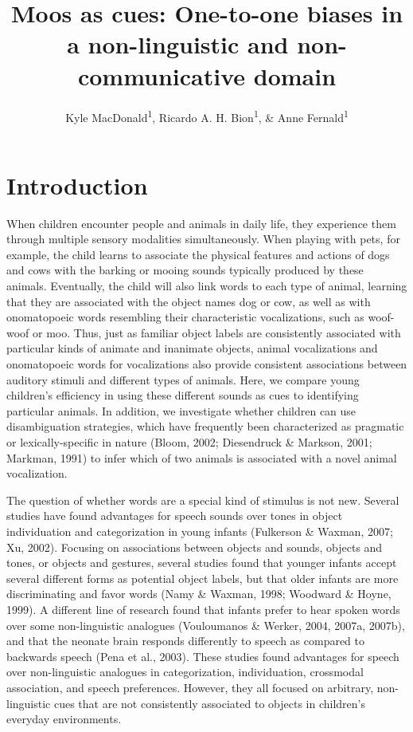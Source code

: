 \documentclass[english,floatsintext,man]{apa6}
\title{Moos as cues: One-to-one biases in a non-linguistic and
non-communicative domain}
\author{Kyle MacDonald\textsuperscript{1}, Ricardo A. H. Bion\textsuperscript{1}, \& Anne Fernald\textsuperscript{1}}
\affiliation{
    \vspace{0.5cm}
          \textsuperscript{1} Stanford University  }
\theoremstyle{definition}
\theoremstyle{definition}
\theoremstyle{definition}
\theoremstyle{remark}
\begin{document}
\maketitle

\setcounter{secnumdepth}{0}



\section{Introduction}\label{introduction}

When children encounter people and animals in daily life, they
experience them through multiple sensory modalities simultaneously. When
playing with pets, for example, the child learns to associate the
physical features and actions of dogs and cows with the barking or
mooing sounds typically produced by these animals. Eventually, the child
will also link words to each type of animal, learning that they are
associated with the object names dog or cow, as well as with
onomatopoeic words resembling their characteristic vocalizations, such
as woof-woof or moo. Thus, just as familiar object labels are
consistently associated with particular kinds of animate and inanimate
objects, animal vocalizations and onomatopoeic words for vocalizations
also provide consistent associations between auditory stimuli and
different types of animals. Here, we compare young children's efficiency
in using these different sounds as cues to identifying particular
animals. In addition, we investigate whether children can use
disambiguation strategies, which have frequently been characterized as
pragmatic or lexically-specific in nature (Bloom, 2002; Diesendruck \&
Markson, 2001; Markman, 1991) to infer which of two animals is
associated with a novel animal vocalization.

The question of whether words are a special kind of stimulus is not new.
Several studies have found advantages for speech sounds over tones in
object individuation and categorization in young infants (Fulkerson \&
Waxman, 2007; Xu, 2002). Focusing on associations between objects and
sounds, objects and tones, or objects and gestures, several studies
found that younger infants accept several different forms as potential
object labels, but that older infants are more discriminating and favor
words (Namy \& Waxman, 1998; Woodward \& Hoyne, 1999). A different line
of research found that infants prefer to hear spoken words over some
non-linguistic analogues (Vouloumanos \& Werker, 2004, 2007a, 2007b),
and that the neonate brain responds differently to speech as compared to
backwards speech (Pena et al., 2003). These studies found advantages for
speech over non-linguistic analogues in categorization, individuation,
crossmodal association, and speech preferences. However, they all
focused on arbitrary, non-linguistic cues that are not consistently
associated to objects in children's everyday environments.
\end{document}
